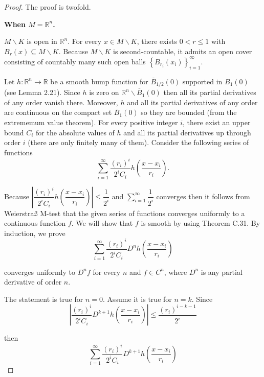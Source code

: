 \begin{proof}
    The proof is twofold.

    \textbf{When \( M = \mathbb{R}^{n} \).}

    \( M \smallsetminus K \) is open in \( \mathbb{R}^{n} \). For every \( x \in M \smallsetminus K \), there exists \( 0 < r \le 1 \) with \( B_{r}(x) \subseteq M \smallsetminus K \). Because \( M \smallsetminus K \) is second-countable, it admits an open cover consisting of countably many such open balls \( {\left\{ B_{r_{i}}(x_{i}) \right\}}_{i=1}^{\infty}  \).

    Let \( h: \mathbb{R}^{n} \to \mathbb{R} \) be a smooth bump function for \( \overline{B}_{1/2}(0) \) supported in \( B_{1}(0) \) (see Lemma 2.21). Since \( h \) is zero on \( \mathbb{R}^{n} \smallsetminus \overline{B}_{1}(0) \) then all its partial derivatives of any order vanish there. Moreover, \( h \) and all its partial derivatives of any order are continuous on the compact set \( \overline{B}_{1}(0) \) so they are bounded (from the extrememum value theorem). For every positive integer \( i \), there exist an upper bound \( C_{i} \) for the absolute values of \( h \) and all its partial derivatives up through order \( i \) (there are only finitely many of them). Consider the following series of functions
    \[
        \sum_{i=1}^{\infty} \dfrac{{(r_{i})}^{i}}{2^{i} C_{i}} h\left( \dfrac{x - x_{i}}{r_{i}} \right).
    \]

    Because \( \left\vert \dfrac{{(r_{i})}^{i}}{2^{i} C_{i}} h\left( \dfrac{x - x_{i}}{r_{i}} \right) \right\vert \le \dfrac{1}{2^{i}} \) and \( \sum_{i=1}^{\infty} \dfrac{1}{2^{i}} \) converges then it follows from Weierstra\ss{} M-test that the given series of functions converges uniformly to a continuous function \( f \). We will show that \( f \) is smooth by using Theorem C.31. By induction, we prove
    \[
        \sum_{i=1}^{\infty} \dfrac{{(r_{i})}^{i}}{2^{i} C_{i}} D^{n} h\left( \dfrac{x - x_{i}}{r_{i}} \right)
    \]

    converges uniformly to \( D^{n}f \) for every \( n \) and \( f \in C^{n} \), where \( D^{n} \) is any partial derivative of order \( n \).

    The statement is true for \( n = 0 \). Assume it is true for \( n = k \). Since
    \[
        \left\vert \dfrac{{(r_{i})}^{i}}{2^{i} C_{i}} D^{k+1} h\left(\dfrac{x - x_{i}}{r_{i}}\right) \right\vert \le \dfrac{{(r_{i})}^{i-k-1}}{2^{i}}
    \]

    then
    \[
        \sum_{i=1}^{\infty} \dfrac{{(r_{i})}^{i}}{2^{i} C_{i}} D^{k+1} h\left( \dfrac{x - x_{i}}{r_{i}} \right)
    \]


\end{proof}
